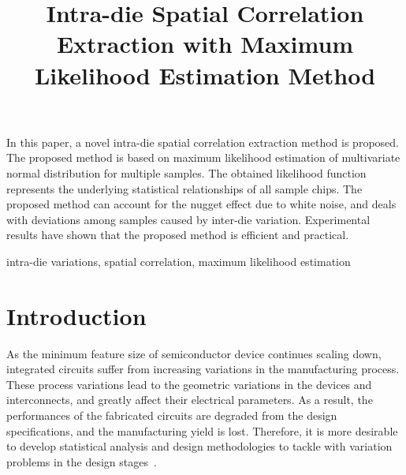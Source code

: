 \documentclass[referee]{ieice}
\title[]{Intra-die Spatial Correlation Extraction with Maximum Likelihood Estimation Method}
\begin{document}
\maketitle
\begin{summary}
In this paper, a novel intra-die spatial correlation extraction
method is proposed. The proposed method is based
on maximum likelihood estimation of multivariate normal distribution
for multiple samples. The obtained likelihood function represents
the underlying statistical relationships of all sample chips. The
proposed method can account for the nugget effect due to white
noise, and deals with deviations among samples caused by inter-die
variation. Experimental results have shown that the proposed method
is efficient and practical.
\end{summary}
\begin{keywords}
intra-die variations, spatial correlation, maximum likelihood
estimation
\end{keywords}

\section{Introduction}
As the minimum feature size of semiconductor device continues
scaling down, integrated circuits suffer from increasing variations
in the manufacturing process. These process variations lead to the
geometric variations in the devices and interconnects, and greatly
affect their electrical parameters. As a result, the performances of
the fabricated circuits are degraded from the design specifications,
and the manufacturing yield is lost. Therefore, it is more desirable
to develop statistical analysis and design methodologies to tackle
with variation problems in the design stages~\cite{Nassif00}.
\end{document}
